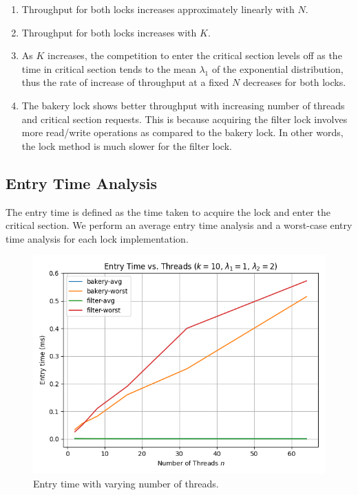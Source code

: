\documentclass[conference,compsoc]{IEEEtran}
\begin{document}
\begin{enumerate}
    \item Throughput for both locks increases approximately linearly with \(N\).
    \item Throughput for both locks increases with \(K\).
    \item As \(K\) increases, the competition to enter the critical section
    levels off as the time in critical section tends to the mean \(\lambda_1\)
    of the exponential distribution, thus the rate of increase of throughput at
    a fixed \(N\) decreases for both locks.
    \item The bakery lock shows better throughput with increasing number of
    threads and critical section requests. This is because acquiring the filter
    lock involves more read/write operations as compared to the bakery lock. In
    other words, the lock method is much slower for the filter lock.
\end{enumerate}

\subsection{Entry Time Analysis}

The entry time is defined as the time taken to acquire the lock and enter the
critical section. We perform an average entry time analysis and a worst-case
entry time analysis for each lock implementation.

\begin{figure}[!ht]
    \centering
    \includegraphics[width=\columnwidth]{images/exp3.png} 
    \caption{Entry time with varying number of threads.}
    \label{fig:exp3}
\end{figure}
\end{document}
